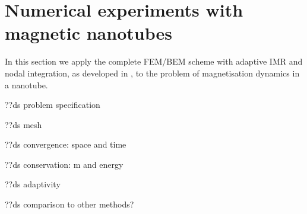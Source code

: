 \chapter{Numerical experiments with magnetic nanotubes}
\label{cha:numer-experiments}

In this section we apply the complete FEM/BEM scheme with adaptive IMR and nodal integration, as developed in , to the problem of magnetisation dynamics in a nanotube.


??ds problem specification


??ds mesh


??ds convergence: space and time


??ds conservation: m and energy


??ds adaptivity


??ds comparison to other methods?


